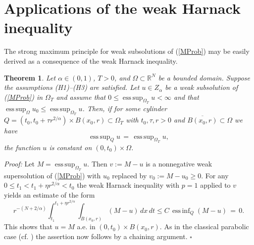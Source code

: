 \documentclass[10pt]{article}
\newtheorem{satz}{Theorem}[section]
\newcommand{\iR}{\mathbb{R}}
\DeclareMathOperator*{\esup}{ess\,sup}
\DeclareMathOperator*{\einf}{ess\,inf}
\begin{document}
\section{Applications of the weak Harnack inequality}
The strong maximum principle for weak subsolutions of (\ref{MProb})
may be easily derived as a consequence of the weak Harnack
inequality.
\begin{satz} \label{strongmax}
Let $\alpha\in(0,1)$, $T>0$, and $\Omega\subset \iR^N$ be a bounded
domain. Suppose the assumptions (H1)--(H3) are satisfied. Let $u\in
Z_\alpha$ be a weak subsolution of (\ref{MProb}) in $\Omega_T$ and
assume that $0\le \esup_{\Omega_T}u<\infty$ and that $\esup_{\Omega}
u_0\le \esup_{\Omega_T}u$. Then, if for some cylinder
$Q=(t_0,t_0+\tau r^{2/\alpha})\times B(x_0,r)\subset \Omega_T$ with
$t_0,\tau,r>0$ and $\overline{B(x_0,r)}\subset \Omega$ we have
\begin{equation} \label{strrel}
\esup_{Q}u \,=\,\esup_{\Omega_T}u,
\end{equation}
the function $u$ is constant on $(0,t_0)\times \Omega$.
\end{satz}
{\em Proof:} Let $M=\esup_{\Omega_T}u$. Then $v:=M-u$ is a
nonnegative weak supersolution of (\ref{MProb}) with $u_0$ replaced
by $v_0:=M-u_0\ge 0$. For any $0\le t_1< t_1+\eta r^{2/\alpha}<t_0$
the weak Harnack inequality with $p=1$ applied to $v$ yields an
estimate of the form
\[
r^{-(N+2/\alpha)}\int_{t_1}^{t_1+\eta
r^{2/\alpha}}\int_{B(x_0,r)}(M-u)\,dx\,dt\le C\,\einf_Q (M-u)\,=\,0.
\]
This shows that $u=M$ a.e. in $(0,t_0)\times B(x_0,r)$. As in the
classical parabolic case (cf. \cite{Lm}) the assertion now follows
by a chaining argument. $\square$

$\mbox{}$
\end{document}
